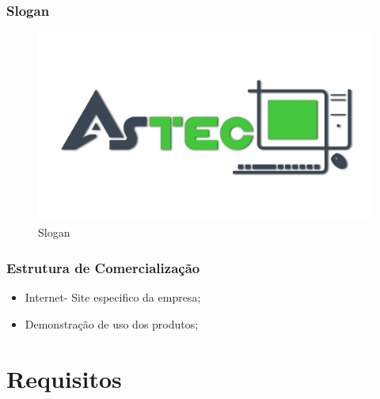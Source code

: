 \documentclass[chapter=TITLE,12pt,oneside,a4paper,english,french,sumario=tradicional,spanish,brazil,]{abntex2}
\begin{document}
\subsection{Slogan}
\begin{figure}[!htpb]\centering
	\includegraphics[scale=0.25]{logo.pdf}\caption{Slogan}
\end{figure}


\subsection{Estrutura de Comercialização}
\begin{itemize}
\item Internet- Site especifico da empresa;
\item Demonstração de uso dos produtos;
\end{itemize}


\chapter{Requisitos}
\vspace{-0.6cm}
\end{document}
